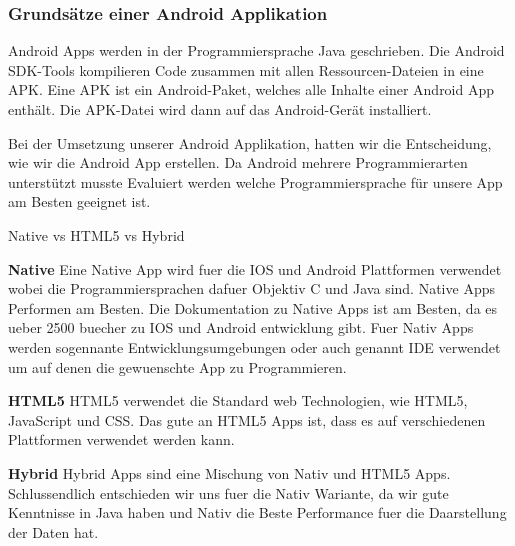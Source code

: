 \subsubsection{Grundsätze einer Android Applikation}
\label{subsec:aapp-fundam}

Android Apps werden in der Programmiersprache Java geschrieben.
Die Android SDK-Tools kompilieren Code zusammen mit allen Ressourcen-Dateien in eine APK.
Eine APK ist ein Android-Paket, welches alle Inhalte einer Android App enthält. 
Die APK-Datei wird dann auf das Android-Gerät installiert. 
\newline

Bei der Umsetzung unserer Android Applikation, hatten wir die Entscheidung, wie wir die Android App erstellen. 
Da Android mehrere Programmierarten unterstützt musste Evaluiert werden welche Programmiersprache für unsere App am Besten geeignet ist. \newline

{\Large Native vs HTML5 vs Hybrid}\newline

\textbf{Native} 
\newline
Eine Native App wird fuer die IOS und Android Plattformen verwendet wobei die Programmiersprachen dafuer Objektiv C und Java sind.
Native Apps Performen am Besten.
Die Dokumentation zu Native Apps ist am Besten, da es ueber 2500 buecher zu IOS und Android entwicklung gibt.
Fuer Nativ Apps werden sogennante Entwicklungsumgebungen oder auch genannt IDE verwendet um auf denen die gewuenschte App zu Programmieren. 

\newline
\textbf{HTML5} 
\newline
HTML5 verwendet die Standard web Technologien, wie HTML5, JavaScript und CSS. Das gute an HTML5 Apps ist, dass es auf verschiedenen Plattformen verwendet werden kann. 
\newline

\textbf{Hybrid} 
\newline
Hybrid Apps sind eine Mischung von Nativ und HTML5 Apps. 
\newline
Schlussendlich entschieden wir uns fuer die Nativ Wariante, da wir gute Kenntnisse in Java haben und Nativ die Beste Performance fuer die Daarstellung der Daten hat.



\clearpage %